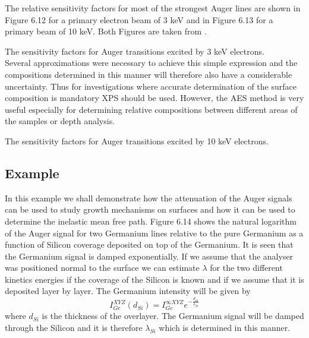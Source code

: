              The  relative  sensitivity  factors  for  most   of   the
          strongest Auger lines are shown in Figure 6.12 for a primary
          electron beam of 3 keV and in Figure 6.13 for a primary beam
          of 10 keV. Both Figures are taken from \cite{handbook}.

          \vspace{12cm}

              The sensitivity  factors  for
          Auger transitions excited by 3 keV electrons.\\

          Several  approximations  were   necessary   to   achieve   this
          simple expression and the compositions determined  in  this
          manner will therefore also have a considerable  uncertainty.
          Thus  for  investigations  where  accurate  determination  of
          the surface composition is mandatory  XPS  should  be  used.
          However, the  AES  method  is  very  useful  especially  for
          determining relative compositions between different areas of
          the samples or  depth analysis.
          \newpage

                  \vspace*{12cm}

              The sensitivity  factors  for
          Auger transitions excited by 10 keV electrons.

          \subsection{Example}
          In this example we shall demonstrate how the attenuation  of
          the Auger signals can be used to study growth  mechanisms  on
          surfaces and how it can be used to determine  the  inelastic
          mean free path.  Figure 6.14 shows the  natural  logarithm  of
          the Auger signal for two Germanium  lines  relative  to  the
          pure Germanium   as  a  function  of  Silicon  coverage
          deposited on top of the  Germanium.  It  is  seen  that  the
          Germanium signal is damped exponentially. If we assume  that
          the analyser was positioned normal to  the  surface  we  can
          estimate $\lambda$ for the two different  kinetics  energies
          if the coverage of the Silicon is known  and  if  we  assume
          that it is deposited layer by layer.
          The Germanium intensity will be given by
          \begin{equation}
          I^{XYZ}_{Ge}(d_{Si})=I^{\infty XYZ}_{Ge}e^{-\frac{d_{Si}}{\lambda_{Si}}}
          \end{equation}
          where $d_{Si}$  is  the  thickness  of  the  overlayer.  The
          Germanium signal will be damped through the Silicon and it is
          therefore $\lambda_{Si}$ which is determined in this manner.

